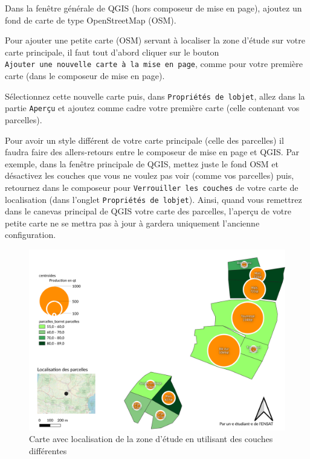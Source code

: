 Dans la fenêtre générale de QGIS (hors composeur de mise en page),
ajoutez un fond de carte de type OpenStreetMap (OSM).

Pour ajouter une petite carte (OSM) servant à localiser la zone d'étude
sur votre carte principale, il faut tout d'abord cliquer sur le bouton
\texttt{Ajouter\ une\ nouvelle\ carte\ à\ la\ mise\ en\ page}, comme
pour votre première carte (dans le composeur de mise en page).

Sélectionnez cette nouvelle carte puis, dans
\texttt{Propriétés\ de\ l\textquotesingle{}objet}, allez dans la partie
\texttt{Aperçu} et ajoutez comme cadre votre première carte (celle
contenant vos parcelles).

Pour avoir un style différent de votre carte principale (celle des
parcelles) il faudra faire des allers-retours entre le composeur de mise
en page et QGIS. Par exemple, dans la fenêtre principale de QGIS, mettez
juste le fond OSM et désactivez les couches que vous ne voulez pas voir
(comme vos parcelles) puis, retournez dans le composeur pour
\texttt{Verrouiller\ les\ couches} de votre carte de localisation (dans
l'onglet \texttt{Propriétés\ de\ l\textquotesingle{}objet}). Ainsi,
quand vous remettrez dans le canevas principal de QGIS votre carte des
parcelles, l'aperçu de votre petite carte ne se mettra pas à jour à
gardera uniquement l'ancienne configuration.

\begin{figure}[htbp]
\centering
\includegraphics{figures/map_withloc.png}
\caption{Carte avec localisation de la zone d'étude en utilisant des
couches différentes}
\end{figure}

